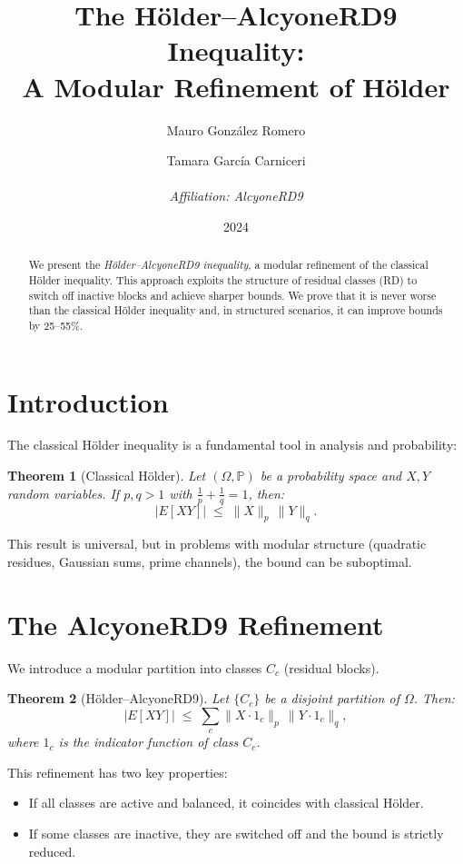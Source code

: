 \documentclass[12pt,a4paper]{article}
\title{\textbf{The Hölder–AlcyoneRD9 Inequality: \\ A Modular Refinement of Hölder}}
\author{
  Mauro González Romero \and Tamara García Carniceri \\
  \\
  \textit{Affiliation: AlcyoneRD9}
}
\date{2024}
\theoremstyle{plain}
\newtheorem{theorem}{Theorem}
\begin{document}
\maketitle

\begin{abstract}
We present the \emph{Hölder–AlcyoneRD9 inequality}, a modular refinement of the classical Hölder inequality. 
This approach exploits the structure of residual classes (RD) to switch off inactive blocks and achieve sharper bounds.
We prove that it is never worse than the classical Hölder inequality and, in structured scenarios, it can improve bounds by 25--55\%.
\end{abstract}

\section{Introduction}
The classical Hölder inequality is a fundamental tool in analysis and probability:

\begin{theorem}[Classical Hölder]
Let $(\Omega,\mathbb{P})$ be a probability space and $X,Y$ random variables. 
If $p,q>1$ with $\tfrac{1}{p}+\tfrac{1}{q}=1$, then:
\[
|E[XY]| \;\leq\; \|X\|_p \, \|Y\|_q.
\]
\end{theorem}

This result is universal, but in problems with modular structure (quadratic residues, Gaussian sums, prime channels), the bound can be suboptimal.

\section{The AlcyoneRD9 Refinement}
We introduce a modular partition into classes $C_c$ (residual blocks).

\begin{theorem}[Hölder–AlcyoneRD9]
Let $\{C_c\}$ be a disjoint partition of $\Omega$. Then:
\[
|E[XY]| \;\leq\; \sum_{c} \|X \cdot 1_c\|_p \, \|Y \cdot 1_c\|_q,
\]
where $1_c$ is the indicator function of class $C_c$.
\end{theorem}

This refinement has two key properties:
\begin{itemize}
    \item If all classes are active and balanced, it coincides with classical Hölder.
    \item If some classes are inactive, they are switched off and the bound is strictly reduced.
\end{itemize}
\end{document}
